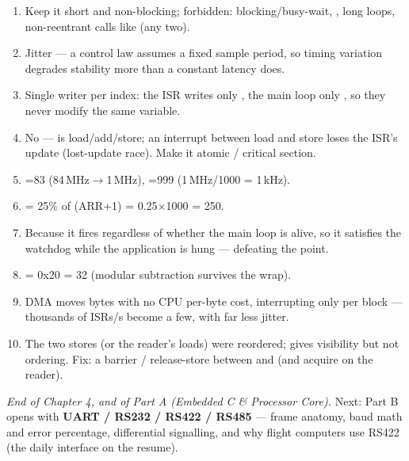 \begin{answerkey}
\begin{enumerate}
\item Keep it short and non-blocking; forbidden: blocking/busy-wait,
  , long loops, non-reentrant calls like  (any two).
\item Jitter --- a control law assumes a fixed sample period, so timing
  variation degrades stability more than a constant latency does.
\item Single writer per index: the ISR writes only , the main loop
  only , so they never modify the same variable.
\item No ---  is load/add/store; an interrupt between load and
  store loses the ISR's update (lost-update race). Make it atomic / critical
  section.
\item {}=83 (84\,MHz$\rightarrow$1\,MHz), =999
  (1\,MHz/1000 = 1\,kHz).
\item {} = 25\% of (ARR+1) = 0.25$\times$1000 = 250.
\item Because it fires regardless of whether the main loop is alive, so it
  satisfies the watchdog while the application is hung --- defeating the point.
\item {} = 0x20 = 32 (modular subtraction
  survives the wrap).
\item DMA moves bytes with no CPU per-byte cost, interrupting only per block ---
  thousands of ISRs/s become a few, with far less jitter.
\item The two stores (or the reader's loads) were reordered; 
  gives visibility but not ordering. Fix: a barrier / release-store between
   and  (and acquire on the reader).
\end{enumerate}
\end{answerkey}

\begin{partnote}
\emph{End of Chapter 4, and of Part A (Embedded C \& Processor Core).} Next:
Part B opens with \textbf{UART / RS232 / RS422 / RS485} --- frame anatomy, baud
math and error percentage, differential signalling, and why flight computers
use RS422 (the daily interface on the resume).
\end{partnote}

